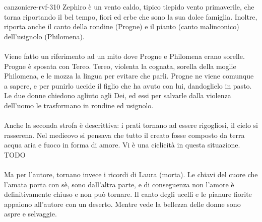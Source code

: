 \documentclass[preview]{standalone}
\begin{document}
\begin{snippet}{canzoniere-rvf-310}
    Zephiro è un vento caldo, tipico tiepido vento primaverile,
    che torna riportando il bel tempo, fiori ed erbe che sono la sua dolce famiglia.
    Inoltre, riporta anche il canto della rondine (Progne) e il pianto (canto malinconico)
    dell'usignolo (Philomena).
    \\\\
    Viene fatto un riferimento ad un mito dove Progne e Philomena erano sorelle.
    Progne è sposata con Tereo. Tereo, violenta la cognata, sorella della moglie Philomena,
    e le mozza la lingua per evitare che parli. Progne ne viene comunque a sapere,
    e per punirlo uccide il figlio che ha avuto con lui, dandoglielo in pasto.
    Le due donne chiedono agliuto agli Dei, ed essi per salvarle dalla violenza dell'uomo
    le trasformano in rondine ed usignolo.
    \\\\
    Anche la seconda strofa è descrittiva: i prati tornano ad essere rigogliosi, il cielo
    si rasserena.
    Nel medieovo si pensava che tutto il creato fosse composto da terra
    acqua aria e fuoco in forma di amore.
    Vi è una ciclicità in questa situazione.
    TODO
    \\\\
    Ma per l'autore, tornano invece i ricordi di Laura (morta).
    Le chiavi del cuore che l'amata porta con sè, sono dall'altra parte, e di conseguenza
    non l'amore è definitivamente chiuso e non può tornare.
    Il canto degli ucelli e le pianure fiorite appaiono all'autore con un deserto.
    Mentre vede la bellezza delle donne sono aspre e selvaggie.
\end{snippet}
\end{document}
